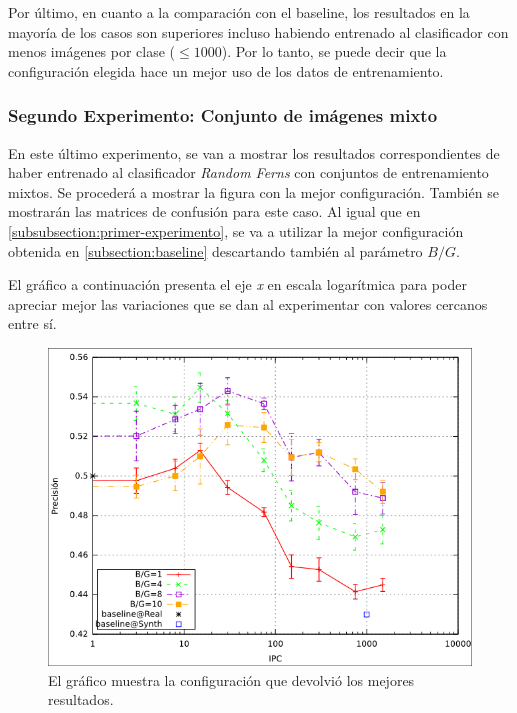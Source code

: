 	Por último, en cuanto a la comparación con el baseline, los resultados en la mayoría de los casos son superiores incluso habiendo entrenado al clasificador con menos imágenes por clase ($\leq 1000$). Por lo tanto, se puede decir que la configuración elegida hace un mejor uso de los datos de entrenamiento.
	
\subsubsection{Segundo Experimento: Conjunto de imágenes mixto}
	
	En este último experimento, se van a mostrar los resultados correspondientes de haber entrenado al clasificador \textit{Random Ferns} con conjuntos de entrenamiento mixtos. Se procederá a mostrar la figura con la mejor configuración. También se mostrarán las matrices de confusión para este caso. Al igual que en \ref{subsubsection:primer-experimento}, se va a utilizar la mejor configuración obtenida en \ref{subsection:baseline} descartando también al parámetro $B/G$.

	El gráfico a continuación presenta el eje \textit{x} en escala logarítmica para poder apreciar mejor las variaciones que se dan al experimentar con valores cercanos entre sí.

			\begin{figure}[!htbp]
				\centering
				\centerline{
					\includegraphics[scale=0.6]{img/resultados/mixtas/best_mean_2040.png}
				}
				\caption[Mixtas media mejor resultado]{El gráfico muestra la configuración que devolvió los mejores resultados.}
				\label{fig: Mixtas-media-mejor}
			\end{figure}

